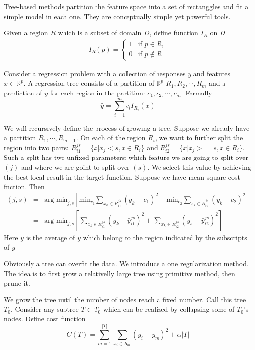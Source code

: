 \documentclass{article}
\author{Yinan Zhu}
\begin{document}
Tree-based methods partition the feature space into a set of rectanggles and fit a simple model in each one. They are conceptually simple yet powerful tools.

Given a region $R$ which is a subset of domain $D$, define function $I_R$ on $D$ 
\begin{eqnarray}
I_R(p)= \left\{
\begin{array}{rl}
1 & \textrm{if } p \in R,\\
0 & \textrm{if } p \notin R
\end{array} \right.\nonumber
\end{eqnarray}

Consider a regression problem with a collection of responses $y$ and features $x\in \mathbb{R}^p$. A regression tree consists of a partition of $\mathbb{R}^p$ $R_1, R_2,\cdots,R_m$ and a prediction of $y$ for each region in the partition: $c_1,c_2,\cdots,c_m$. Formally
\[
\hat{y}=\sum_{i=1}^m c_iI_{R_i}(x)
\]

We will recursively define the process of growing a tree. Suppose we already have a partition $R_1,\cdots, R_{m-1}$. On each of the region $R_i$, we want to further split the region into two parts: $R_{i1}^{js}=\{x|x_j<s,x\in R_i\}$ and $R_{i2}^{js}=\{x|x_j>=s,x\in R_i\}$. Such a split has two unfixed parameters: which feature we are going to split over $(j)$ and where we are goint to split over $(s)$. We select this value by achieving the best local result in the target function. Suppose we have mean-square cost fnction. Then
\begin{eqnarray}
(j,s)&=&\textrm{arg min}_{j,s}[\textrm{min}_{c_1}\sum_{x_k\in R_{i1}^{js}}(y_k-c_1)^2+\textrm{min}_{c_2}\sum_{x_k\in R_{i2}^{js}}(y_k-c_2)^2]\nonumber\\
&=&\textrm{arg min}_{j,s}[\sum_{x_k\in R_{i1}^{js}}(y_k-\bar{y}_{i1}^{js})^2+\sum_{x_k\in R_{i2}^{js}}(y_k-\bar{y}_{i2}^{js})^2]\nonumber
\end{eqnarray}
Here $\bar{y}$ is the average of $y$ which belong to the region indicated by the subscripts of $\bar{y}$

Obviously a tree can overfit the data. We introduce a one regularization method. The idea is to first grow a relativelly large tree using primitive method, then prune it. 

We grow the tree until the number of nodes reach a fixed number. Call this tree $T_0$. Consider any subtree $T \subset T_0$ which can be realized by collapsing some of $T_0$'s nodes. Define cost function
\[
C(T)=\sum_{m=1}^{|T|}\sum_{x_i\in R_m}(y_i-\bar{y}_m)^2+\alpha|T|
\]
\end{document}
